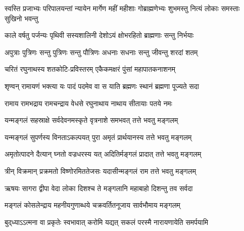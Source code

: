 
\fourlineindentedshloka
{स्वस्ति प्रजाभ्यः परिपालयन्तां}
{न्यायेन मार्गेण महीं महीशाः}
{गोब्राह्मणेभ्यः शुभमस्तु नित्यं}
{लोकाः समस्ताः सुखिनो भवन्तु}

\twolineshloka
{काले वर्षतु पर्जन्यः पृथिवी सस्यशालिनी}
{देशोऽयं क्षोभरहितो ब्राह्मणाः सन्तु निर्भयाः}

\twolineshloka
{अपुत्राः पुत्रिणः सन्तु पुत्रिणः सन्तु पौत्रिणः}
{अधनाः सधनाः सन्तु जीवन्तु शरदां शतम्}

\twolineshloka
{चरितं रघुनाथस्य शतकोटि-प्रविस्तरम्}
{एकैकमक्षरं पुंसां महापातकनाशनम्}

\twolineshloka
{शृण्वन् रामायणं भक्त्या यः पादं पदमेव वा}
{स याति ब्रह्मणः स्थानं ब्रह्मणा पूज्यते सदा}

\twolineshloka
{रामाय रामभद्राय रामचन्द्राय वेधसे}
{रघुनाथाय नाथाय सीतायाः पतये नमः}

\twolineshloka
{यन्मङ्गलं सहस्राक्षे सर्वदेवनमस्कृते}
{वृत्रनाशे समभवत् तत्ते भवतु मङ्गलम्}

\twolineshloka
{यन्मङ्गलं सुपर्णस्य विनताऽकल्पयत् पुरा}
{अमृतं प्रार्थयानस्य तत्ते भवतु मङ्गलम्}

\twolineshloka
{अमृतोत्पादने दैत्यान् घ्नतो वज्रधरस्य यत्}
{अदितिर्मङ्गलं प्रादात् तत्ते भवतु मङ्गलम्}

\twolineshloka
{त्रीन् विक्रमान् प्रक्रमतो विष्णोरमिततेजसः}
{यदासीन्मङ्गलं राम तत्ते भवतु मङ्गलम्}

\twolineshloka
{ऋषयः सागरा द्वीपा वेदा लोका दिशश्च ते}
{मङ्गलानि महाबाहो दिशन्तु तव सर्वदा}

\twolineshloka
{मङ्गलं कोसलेन्द्राय महनीयगुणाब्धये}
{चक्रवर्तितनूजाय सार्वभौमाय मङ्गलम्}

{बुद्‌ध्याऽऽत्मना वा प्रकृतेः स्वभावात्}
{करोमि यद्यत् सकलं परस्मै}
{नारायणायेति समर्पयामि}
